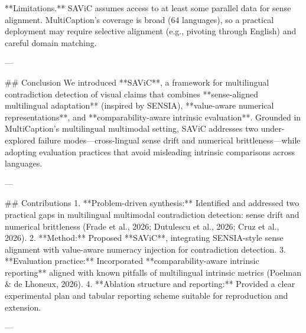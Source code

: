 **Limitations.** SAViC assumes access to at least some parallel data for sense alignment. MultiCaption’s coverage is broad (64 languages), so a practical deployment may require selective alignment (e.g., pivoting through English) and careful domain matching.

---

## Conclusion  
We introduced **SAViC**, a framework for multilingual contradiction detection of visual claims that combines **sense-aligned multilingual adaptation** (inspired by SENSIA), **value-aware numerical representations**, and **comparability-aware intrinsic evaluation**. Grounded in MultiCaption’s multilingual multimodal setting, SAViC addresses two under-explored failure modes—cross-lingual sense drift and numerical brittleness—while adopting evaluation practices that avoid misleading intrinsic comparisons across languages.

---

## Contributions  
1. **Problem-driven synthesis:** Identified and addressed two practical gaps in multilingual multimodal contradiction detection: sense drift and numerical brittleness (Frade et al., 2026; Dutulescu et al., 2026; Cruz et al., 2026).  
2. **Method:** Proposed **SAViC**, integrating SENSIA-style sense alignment with value-aware numeracy injection for contradiction detection.  
3. **Evaluation practice:** Incorporated **comparability-aware intrinsic reporting** aligned with known pitfalls of multilingual intrinsic metrics (Poelman & de Lhoneux, 2026).  
4. **Ablation structure and reporting:** Provided a clear experimental plan and tabular reporting scheme suitable for reproduction and extension.

---